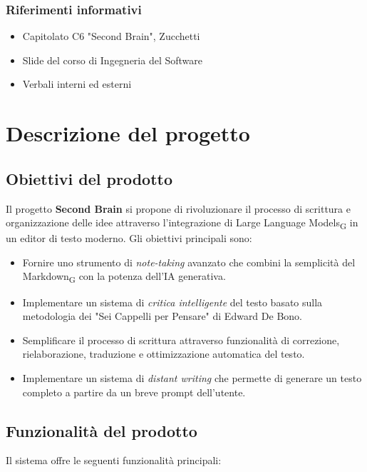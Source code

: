 \documentclass[11pt,a4paper]{article}
\begin{document}
\subsubsection{Riferimenti informativi}
\begin{itemize}
    \item Capitolato C6 "Second Brain", Zucchetti
    \item Slide del corso di Ingegneria del Software
    \item Verbali interni ed esterni
\end{itemize}

\newpage

\section{Descrizione del progetto}
\subsection{Obiettivi del prodotto}
Il progetto \textbf{Second Brain} si propone di rivoluzionare il processo di scrittura e organizzazione delle idee attraverso l'integrazione di Large Language Models\textsubscript{G} in un editor di testo moderno. Gli obiettivi principali sono:

\begin{itemize}
    \item Fornire uno strumento di \textit{note-taking} avanzato che combini la semplicità del Markdown\textsubscript{G} con la potenza dell'IA generativa.
    \item Implementare un sistema di \textit{critica intelligente} del testo basato sulla metodologia dei "Sei Cappelli per Pensare" di Edward De Bono.
    \item Semplificare il processo di scrittura attraverso funzionalità di correzione, rielaborazione, traduzione e ottimizzazione automatica del testo.
    \item Implementare un sistema di \textit{distant writing} che permette di generare un testo completo a partire da un breve prompt dell'utente.
\end{itemize}


\subsection{Funzionalità del prodotto}
Il sistema offre le seguenti funzionalità principali:
\end{document}
